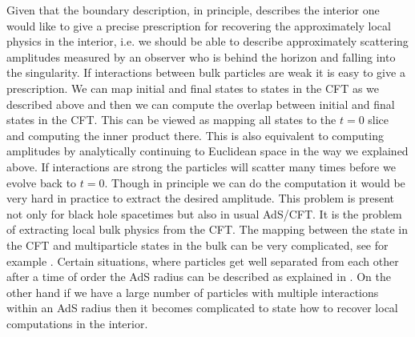 Given that the boundary description, in principle, describes the interior
one would  like to give a precise prescription for recovering the 
approximately local
physics in the interior, i.e. we should be able to describe approximately
scattering amplitudes measured by an observer who is behind the horizon
and falling into the singularity. 
If interactions between bulk particles are weak 
it is easy to give a prescription.  We can 
map initial and final states to states in the CFT as we
described above and then we can compute the overlap between  initial
and final states in the CFT. This can be viewed as mapping all states
to the $t=0$ slice and computing the inner product there. This is also
equivalent to computing amplitudes by 
 analytically continuing to Euclidean space in the way we explained above. 
If interactions are strong   the particles will scatter many times
before we evolve back to $t=0$. Though in principle we can do the 
computation it would be very hard in practice to extract the desired 
amplitude. 
This problem is present not  only for  black hole spacetimes 
but also  in usual  AdS/CFT. It is the problem of extracting
local bulk physics from the CFT. 
  The mapping between the 
state in the CFT and multiparticle states in the bulk can be very 
complicated, see for example \precusors . 
Certain situations, where particles get well separated from each
other after a time of order the AdS radius can be described 
as explained in \polchinski . On the other hand if we have a large number
of particles with multiple interactions within an AdS radius then it
becomes complicated to state how to recover local computations in the
interior.

 
